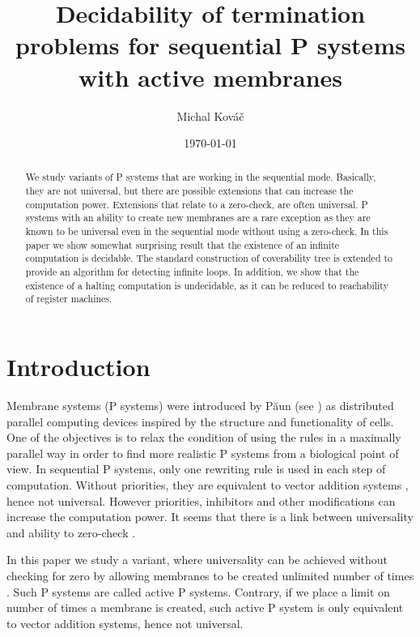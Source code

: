 \documentclass[llncs,submission,copyright,creativecommons]{../lib/lncs/llncs}
\begin{document}
\title{Decidability of termination problems for sequential P systems with active membranes}
\author{Michal Kováč}
\date{\today}
\maketitle

\begin{abstract}
We study variants of P systems that are working in the sequential mode. Basically, they are not universal, but there are possible extensions that can increase the computation power. Extensions that relate to a zero-check, are often universal.
P systems with an ability to create new membranes are a rare exception as they are known to be universal even in the sequential mode without using a zero-check.
In this paper we show somewhat surprising result that the existence of an infinite computation is decidable. The standard construction of coverability tree is extended to provide an algorithm for detecting infinite loops.
In addition, we show that the existence of a halting computation is undecidable, as it can be reduced to reachability of register machines.
\end{abstract}

\section{Introduction}
\label{sec:introduction}


Membrane systems (P systems) were introduced by P\u{a}un (see \cite{Paun2000108}) as distributed parallel computing devices inspired by the structure and functionality of cells.
One of the objectives is to relax the condition of using the rules in a maximally parallel way in order to find more realistic P systems from a biological point of view.
In sequential P systems, only one rewriting rule is used in each step of computation. Without priorities, they are equivalent to vector addition systems \cite{Ibarra05Active}, hence not universal. However priorities, inhibitors and other modifications can increase the computation power. It seems that there is a link between universality and ability to zero-check \cite{Alhazov12Properties}.

In this paper we study a variant, where universality can be achieved without checking for zero by allowing membranes to be created unlimited number of times \cite{Ibarra05Active}. Such P systems are called active P systems. Contrary, if we place a limit on number of times a membrane is created, such active P system is only equivalent to vector addition systems, hence not universal.
\end{document}
